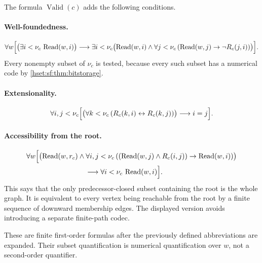 \documentclass[11pt,letterpaper]{article}
\theoremstyle{definition}
\theoremstyle{remark}
\newcommand{\Readp}{\operatorname{Read}}
\newcommand{\Valid}{\operatorname{Valid}}
\begin{document}
The formula $\Valid(c)$ adds the following conditions.

\paragraph{Well-foundedness.}
\begin{equation}\label{hset:sf:eq:wf}
 \forall w\Bigl[\bigl(\exists i<\nu_c\,\Readp(w,i)\bigr)\longrightarrow
 \exists i<\nu_c\bigl(\Readp(w,i)\land
 \forall j<\nu_c\,(\Readp(w,j)\to\neg R_c(j,i))\bigr)\Bigr].
\end{equation}
Every nonempty subset of $\nu_c$ is tested, because every such subset has a
numerical code by \cref{hset:sf:thm:bitstorage}.

\paragraph{Extensionality.}
\begin{equation}\label{hset:sf:eq:extgraph}
 \forall i,j<\nu_c\Bigl[\bigl(\forall k<\nu_c\,(R_c(k,i)\leftrightarrow R_c(k,j))\bigr)
 \longrightarrow i=j\Bigr].
\end{equation}

\paragraph{Accessibility from the root.}
\begin{equation}\label{hset:sf:eq:access}
\begin{split}
 \forall w\Bigl[&\bigl(\Readp(w,r_c)\land
 \forall i,j<\nu_c\,((\Readp(w,j)\land R_c(i,j))\to\Readp(w,i))\bigr)\\
 &\hspace{23mm}\longrightarrow\forall i<\nu_c\,\Readp(w,i)\Bigr].
\end{split}
\end{equation}
This says that the only predecessor-closed subset containing the root is the
whole graph. It is equivalent to every vertex being reachable from the root by a
finite sequence of downward membership edges. The displayed version avoids
introducing a separate finite-path codec.

These are finite first-order formulas after the previously defined abbreviations
are expanded. Their subset quantification is numerical quantification over $w$,
not a second-order quantifier.
\end{document}
